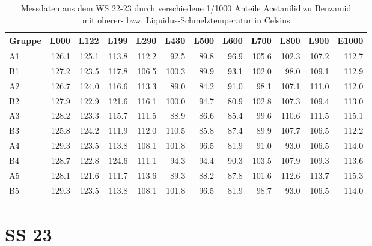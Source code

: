 \begin{table}[h]
\centering \begin{tabular}{lrrrrrrrrrrr}
\toprule
Gruppe & L000 & L122 & L199 & L290 & L430 & L500 & L600 & L700 & L800 & L900 & E1000 \\
\midrule
A1 & 126.1 & 125.1 & 113.8 & 112.2 & 92.5 & 89.8 & 96.9 & 105.6 & 102.3 & 107.2 & 112.7 \\
B1 & 127.2 & 123.5 & 117.8 & 106.5 & 100.3 & 89.9 & 93.1 & 102.0 & 98.0 & 109.1 & 112.9 \\
A2 & 126.7 & 124.0 & 116.6 & 113.3 & 89.0 & 84.2 & 91.0 & 98.1 & 107.1 & 111.0 & 112.0 \\
B2 & 127.9 & 122.9 & 121.6 & 116.1 & 100.0 & 94.7 & 80.9 & 102.8 & 107.3 & 109.4 & 113.0 \\
A3 & 128.2 & 123.3 & 115.7 & 111.5 & 88.9 & 86.6 & 85.4 & 99.6 & 110.6 & 111.5 & 115.1 \\
B3 & 125.8 & 124.2 & 111.9 & 112.0 & 110.5 & 85.8 & 87.4 & 89.9 & 107.7 & 106.5 & 112.2 \\
A4 & 129.3 & 123.5 & 113.8 & 108.1 & 101.8 & 96.5 & 81.9 & 91.0 & 93.0 & 106.5 & 114.0 \\
B4 & 128.7 & 122.8 & 124.6 & 111.1 & 94.3 & 94.4 & 90.3 & 103.5 & 107.9 & 109.3 & 113.6 \\
A5 & 128.1 & 121.6 & 111.7 & 113.6 & 89.3 & 88.2 & 87.8 & 101.6 & 112.6 & 113.7 & 115.3 \\
B5 & 129.3 & 123.5 & 113.8 & 108.1 & 101.8 & 96.5 & 81.9 & 98.7 & 93.0 & 106.5 & 114.0 \\
\bottomrule
\end{tabular}
\caption{Messdaten aus dem WS 22-23 durch verschiedene 1/1000 Anteile Acetanilid zu Benzamid\\mit oberer- bzw. Liquidus-Schmelztemperatur in Celsius}
\end{table}
\newpage\section*{SS 23}
